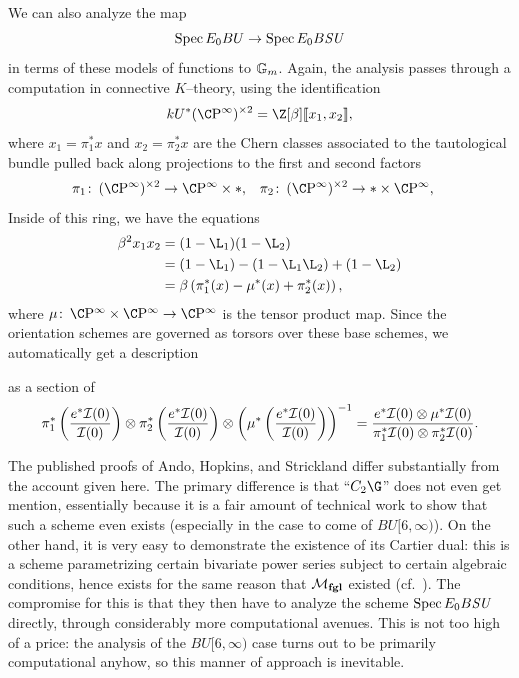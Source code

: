 \begin{remark}\label{BSUToBU}
We can also analyze the map \[\operatorname{Spec} E_0 BU \to \operatorname{Spec} E_0 B\mathit{SU}\] in terms of these models of functions to \(\mathbb G_m\).
Again, the analysis passes through a computation in connective \(K\)--theory, using the identification \[kU^*(\CP^\infty)^{\times 2} = \Z[\beta]\ps{x_1, x_2},\] where \(x_1 = \pi_1^* x\) and \(x_2 = \pi_2^* x\) are the Chern classes associated to the tautological bundle pulled back along projections to the first and second factors
\begin{align*}
\pi_1\co (\CP^\infty)^{\times 2} & \to \CP^\infty \times *, &
\pi_2\co (\CP^\infty)^{\times 2} & \to * \times \CP^\infty,
\end{align*}
Inside of this ring, we have the equations
\begin{align*}
\beta^2 x_1 x_2 & = (1 - \L_1)(1 - \L_2) \\
& = (1 - \L_1) - (1 - \L_1 \L_2) + (1 - \L_2) \\
& = \beta\left(\pi_1^*(x) - \mu^*(x) + \pi_2^*(x) \right),
\end{align*}
where \(\mu\co \CP^\infty \times \CP^\infty \to \CP^\infty\) is the tensor product map.
Since the orientation schemes are governed as torsors over these base schemes, we automatically get a description
\begin{center}
\end{center}
as a section of
\[\pi_1^* \left(\frac{e^* \mathcal{I}(0)}{\mathcal{I}(0)}\right) \otimes \pi_2^* \left(\frac{e^* \mathcal{I}(0)}{\mathcal{I}(0)}\right) \otimes \left(\mu^* \left(\frac{e^* \mathcal{I}(0)}{\mathcal{I}(0)}\right) \right)^{-1} = \frac{e^* \mathcal{I}(0) \otimes \mu^* \mathcal{I}(0)}{\pi_1^* \mathcal{I}(0) \otimes \pi_2^* \mathcal{I}(0)}.\]
\end{remark}

\begin{remark}\label{CUpper3Exists}
The published proofs of Ando, Hopkins, and Strickland differ substantially from the account given here.
The primary difference is that ``\(C_2 \G\)'' does not even get mention, essentially because it is a fair amount of technical work to show that such a scheme even exists (especially in the case to come of \(BU[6, \infty)\)).
On the other hand, it is very easy to demonstrate the existence of its Cartier dual: this is a scheme parametrizing certain bivariate power series subject to certain algebraic conditions, hence exists for the same reason that \(\mathcal{M}_{\mathbf{fgl}}\) existed (cf.\ ).
The compromise for this is that they then have to analyze the scheme \(\operatorname{Spec} E_0 B\mathit{SU}\) directly, through considerably more computational avenues.
This is not too high of a price: the analysis of the \(BU[6, \infty)\) case turns out to be primarily computational anyhow, so this manner of approach is inevitable.
\end{remark}

